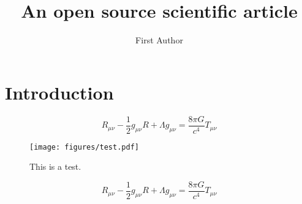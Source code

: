 \documentclass[twocolumn]{aastex631}
\begin{document}
\title{An open source scientific article}

\author[0000-0000-0000-0000]{First Author}

\begin{abstract}
    \blindtext
\end{abstract}

\section{Introduction}
\[
R_{\mu\nu}-\frac{1}{2}g_{\mu\nu}R+\Lambda g_{\mu\nu} = \frac{8\pi G}{c^4}T_{\mu\nu}
\]

\begin{figure*}
    \begin{centering}
        \texttt{[image: figures/test.pdf]}
        \caption{This is a test.}
        \label{fig:test}
    \end{centering}
\end{figure*}

\Blindtext[4]

\[
R_{\mu\nu}-\frac{1}{2}g_{\mu\nu}R+\Lambda g_{\mu\nu} = \frac{8\pi G}{c^4}T_{\mu\nu}
\]
\end{document}

